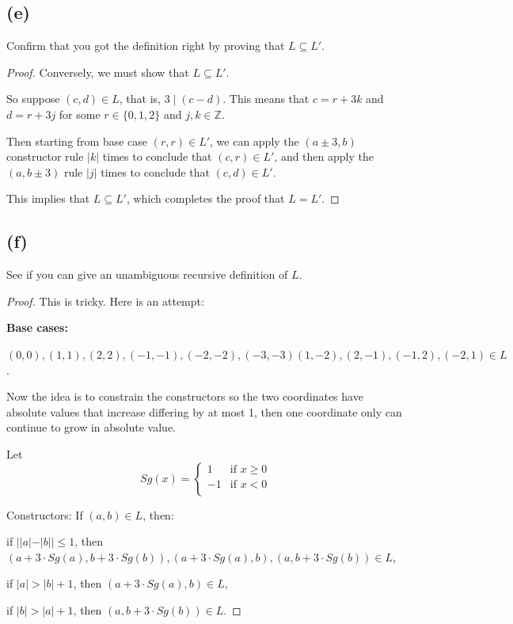 \documentclass[14pt]{extarticle}
\begin{document}
\subsection{(e)}
Confirm that you got the definition right by proving that $L \subseteq L'$.
\begin{proof}
Conversely, we must show that $L \subseteq L'$. 

So suppose $(c, d) \in L$, that is, $3 \mid (c - d)$. This means that $c = r + 3k$ and $d = r + 3j$ for some $r \in \{0, 1, 2\}$ and $j, k \in \mathbb{Z}$. 

Then starting from base case $(r, r) \in L'$, we can apply the $(a \pm 3, b)$ constructor rule $|k|$ times to conclude that $(c, r) \in L'$, and then apply the $(a, b \pm 3)$ rule $|j|$ times to conclude that $(c, d) \in L'$. 

This implies that $L \subseteq L'$, which completes the proof that $L = L'$.
\end{proof}

\subsection{(f)}
See if you can give an unambiguous recursive definition of $L$.
\begin{proof}
This is tricky. Here is an attempt:

{\bf Base cases: }

$(0, 0), (1, 1), (2, 2), (-1, -1), (-2, -2), (-3, -3)(1, -2), (2, -1), (-1, 2), (-2, 1) \in L$.

Now the idea is to constrain the constructors so the two coordinates have absolute values that increase differing by at most 1, then one coordinate only can continue to grow in absolute value.

Let
$$
Sg(x) = \left\{
     \begin{array}{lr}
       1 & \text{if } x \geq 0 \\
       -1 & \text{if } x < 0 \\
     \end{array}
   \right.
$$

Constructors: If $(a, b) \in L$, then:

if $||a| - |b|| \leq 1$, then $(a + 3\cdot Sg(a), b + 3 \cdot Sg(b)), (a + 3\cdot Sg(a), b), (a, b + 3\cdot Sg(b)) \in L$,

if $|a| > |b| + 1$, then $(a + 3\cdot Sg(a), b) \in L$,

if $|b| > |a| + 1$, then $(a, b + 3\cdot Sg(b)) \in L$.
\end{proof}
\end{document}

